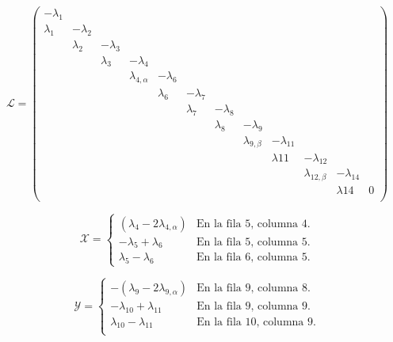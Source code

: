 \begin{equation}
	\mathcal{L}=\left(\begin{smallmatrix}
		-\lambda_1& & & & & & & & & & & \\								%
		\lambda_1&-\lambda_2& & & & & & & & & & \\						%
		&\lambda_2&-\lambda_3& & & & & & & & & \\						%
		& & \lambda_3&-\lambda_4& & & & & & & & \\						%
		& & &\lambda_{4, \alpha}&-\lambda_6& & & & & & & \\				%
		& & & &\lambda_6 &-\lambda_7& & & & & & \\						%
		& & & & &\lambda_7&-\lambda_8& & & & & \\						%
		& & & & & &\lambda_8&-\lambda_9& & & & \\						%
		& & & & & & &\lambda_{9, \beta}&-\lambda_{11}& & & \\			%
		& & & & & & & &\lambda{11}&-\lambda_{12}& & \\					%
		& & & & & & & & &\lambda_{12, \beta}&-\lambda_{14}&\\			%
		& & & & & & & & & &\lambda{14}& 0\\								%
	\end{smallmatrix}\right)\label{matriz_determinista_alternativa}
\end{equation}

\begin{equation}
	\mathcal{X}=\begin{cases}
		(\lambda_4-2\lambda_{4, \alpha}) & \textrm{En la fila 5, columna 4.}\\
		-\lambda_5+\lambda_6 & \textrm{En la fila 5, columna 5.}\\
		\lambda_5-\lambda_6 & \textrm{En la fila 6, columna 5.}
	\end{cases}\label{matriz_estocastica_x}
\end{equation}

\begin{equation}
	\mathcal{Y}=\begin{cases}
		-(\lambda_9-2\lambda_{9, \alpha}) & \textrm{En la fila 9, columna 8.}\\
		-\lambda_{10}+\lambda_{11} & \textrm{En la fila 9, columna 9.} \\
		\lambda_{10}-\lambda_{11} & \textrm{En la fila 10, columna 9.} \\
	\end{cases}\label{matriz_estocastica_y}
\end{equation}

